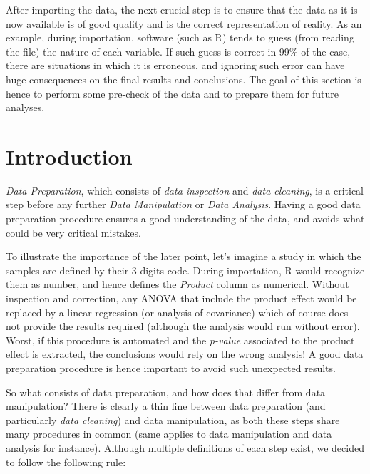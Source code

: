 \documentclass[
]{krantz}
\renewenvironment{quote}{\begin{VF}}{\end{VF}}
\begin{document}
\begin{quote}
After importing the data, the next crucial step is to ensure that the data as it is now available is of good quality and is the correct representation of reality. As an example, during importation, software (such as R) tends to guess (from reading the file) the nature of each variable. If such guess is correct in 99\% of the case, there are situations in which it is erroneous, and ignoring such error can have huge consequences on the final results and conclusions. The goal of this section is hence to perform some pre-check of the data and to prepare them for future analyses.
\end{quote}

\hypertarget{introduction-1}{%
\section{Introduction}\label{introduction-1}}

\emph{Data Preparation}, which consists of \emph{data inspection} and \emph{data cleaning}, is a critical step before any further \emph{Data Manipulation} or \emph{Data Analysis}. Having a good data preparation procedure ensures a good understanding of the data, and avoids what could be very critical mistakes.

To illustrate the importance of the later point, let's imagine a study in which the samples are defined by their 3-digits code.
During importation, R would recognize them as number, and hence defines the \emph{Product} column as numerical. Without inspection and correction, any ANOVA that include the product effect would be replaced by a linear regression (or analysis of covariance) which of course does not provide the results required (although the analysis would run without error). Worst, if this procedure is automated and the \emph{p-value} associated to the product effect is extracted, the conclusions would rely on the wrong analysis! A good data preparation procedure is hence important to avoid such unexpected results.

So what consists of data preparation, and how does that differ from data manipulation?
There is clearly a thin line between data preparation (and particularly \emph{data cleaning}) and data manipulation, as both these steps share many procedures in common (same applies to data manipulation and data analysis for instance). Although multiple definitions of each step exist, we decided to follow the following rule:
\end{document}
